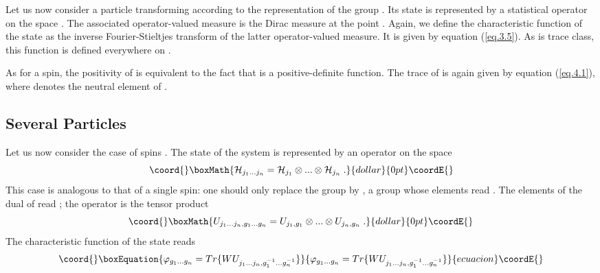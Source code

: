 \documentclass[a4paper,11pt]{article}
\begin{document}
Let us now consider a particle transforming according to the representation \myHighlight{$\chi$}\coordHE{} of the 
group \coordHE{}. Its state is represented by a statistical operator \coordHE{} on the space \myHighlight{$\Hc_{\chi}$}\coordHE{}. 
The associated 
operator-valued measure is the Dirac measure \coordHE{} at the point \myHighlight{$\chi$}\coordHE{}. Again, we define the 
characteristic function of the state as the inverse Fourier-Stieltjes transform of the latter 
operator-valued measure. It is given by equation (\ref{eq.3.5}). As \coordHE{} is trace class, this 
function is defined everywhere on \coordHE{}. 

As for a spin, the positivity of \coordHE{} is equivalent to the fact that \myHighlight{$\varphi$}\coordHE{} is a 
positive-definite 
function. The trace of \coordHE{} is again given by equation (\ref{eq.4.1}), where \coordHE{} denotes the 
neutral element of \coordHE{}.

\subsection{Several Particles}

Let us now consider the case of \coordHE{} spins \coordHE{}. The state of the system is represented 
by 
an operator \coordHE{} on the space
$$\coord{}\boxMath{
   \Hc_{j_1 ... j_n} = \Hc_{j_1}\otimes ... \otimes \Hc_{j_n} \; .
}{dollar}{0pt}\coordE{}$$
 This case is analogous to that of a single spin: one should only 
replace the group \coordHE{} by \coordHE{}, a group whose elements read \coordHE{}. The 
elements of the dual of \coordHE{} read \coordHE{}; the operator \coordHE{}
 is the tensor product
$$\coord{}\boxMath{
   U_{j_1 ... j_n,g_1 ... g_n} = U_{j_1,g_1} \otimes ... \otimes U_{j_n,g_n}  \; .
}{dollar}{0pt}\coordE{}$$
The characteristic function of the state \coordHE{} reads
\begin{equation}\coord{}\boxEquation{
 \label{eq.4.2}
  \varphi_{g_1 ... g_n} = Tr \{ W  U_{j_1 ... j_n,g_1^{-1} ... g_n^{-1}} \}
}{
 \varphi_{g_1 ... g_n} = Tr \{ W  U_{j_1 ... j_n,g_1^{-1} ... g_n^{-1}} \}
}{ecuacion}\coordE{}\end{equation}
\end{document}
